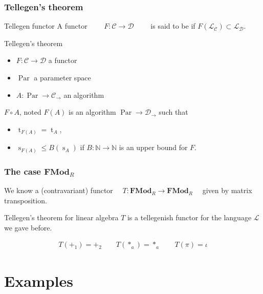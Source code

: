 \documentclass[10pt]{beamer}
\newcommand{\cat}[1]{\mathscr{#1}}
\newcommand{\lcat}[1]{\mathbf{#1}}
\newcommand{\C}{\cat{C}}
\newcommand{\D}{\cat{D}}
\renewcommand{\L}{\cat{L}}
\newcommand{\comp}{\circ}
\newcommand{\N}{\mathbb{N}}
\newcommand{\ra}{\rightarrow}
\DeclareMathOperator{\Time}{t}
\DeclareMathOperator{\Space}{s}
\DeclareMathOperator{\Par}{Par}
\begin{document}
\begin{frame}
  \frametitle{Tellegen's theorem}

  \begin{block}{Tellegen functor}
    A functor $\qquad F:\C\ra\D \qquad$ is said to be
     if $F(\L_\C) \subset
    \L_\D$.
  \end{block}

  \begin{block}{Tellegen's theorem}
    \begin{itemize}
    \item $F:\C\ra\D$ a 
      functor
    \item $\Par$ a parameter space
    \item $A:\Par\ra\C_\ra$ an algorithm
    \end{itemize}

    $F\comp A$, noted $F(A)$ is an algorithm $\Par\ra\D_\ra$ such that
    \begin{itemize}
    \item $\Time_{F(A)} = \Time_A$,
    \item $\Space_{F(A)} \le B(\Space_A)$ if $B:\N\ra\N$ is an upper
      bound for $F$.
    \end{itemize}
  \end{block}
\end{frame}


\begin{frame}
  \frametitle{The case $\lcat{FMod}_R$}
  
  \begin{center}
    We know a (contravariant) functor $\quad
    T:\lcat{FMod}_R\ra\lcat{FMod}_R\quad$ given by matrix
    transposition.
  \end{center}

  \begin{block}{Tellegen's theorem for linear algebra}
    $T$ is a tellegenish functor for the language $\L$ we gave before.
  \end{block}

  \begin{align*}
    T(+_1) = +_2 \qquad T(*_a) = *_a \qquad T(\pi) = \iota
  \end{align*}
\end{frame}



\section{Examples}
\end{document}
